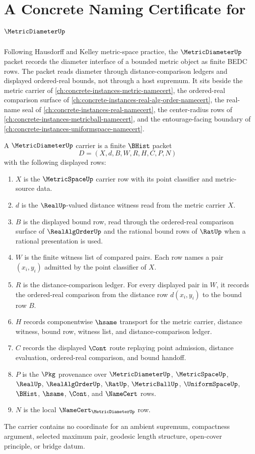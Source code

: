\chapter{A Concrete Naming Certificate for $\MetricDiameterUp$}
\label{ch:concrete-instances-metric-diameter-namecert}

Following Hausdorff and Kelley metric-space practice, the $\MetricDiameterUp$ packet records the diameter interface of a bounded metric object as finite BEDC rows. The packet reads diameter through distance-comparison ledgers and displayed ordered-real bounds, not through a host supremum. It sits beside the metric carrier of \autoref{ch:concrete-instances-metric-namecert}, the ordered-real comparison surface of \autoref{ch:concrete-instances-real-alg-order-namecert}, the real-name seal of \autoref{ch:concrete-instances-real-namecert}, the center-radius rows of \autoref{ch:concrete-instances-metricball-namecert}, and the entourage-facing boundary of \autoref{ch:concrete-instances-uniformspace-namecert}.

\begin{definition}
\label{def:metric-diameter-bhist-carrier}
A $\MetricDiameterUp$ carrier is a finite $\BHist$ packet
$$
D=(X,d,B,W,R,H,C,P,N)
$$
with the following displayed rows:
\begin{enumerate}
\item $X$ is the $\MetricSpaceUp$ carrier row with its point classifier and metric-source data.
\item $d$ is the $\RealUp$-valued distance witness read from the metric carrier $X$.
\item $B$ is the displayed bound row, read through the ordered-real comparison surface of $\RealAlgOrderUp$ and the rational bound rows of $\RatUp$ when a rational presentation is used.
\item $W$ is the finite witness list of compared pairs. Each row names a pair $(x_i,y_i)$ admitted by the point classifier of $X$.
\item $R$ is the distance-comparison ledger. For every displayed pair in $W$, it records the ordered-real comparison from the distance row $d(x_i,y_i)$ to the bound row $B$.
\item $H$ records componentwise $\hsame$ transport for the metric carrier, distance witness, bound row, witness list, and distance-comparison ledger.
\item $C$ records the displayed $\Cont$ route replaying point admission, distance evaluation, ordered-real comparison, and bound handoff.
\item $P$ is the $\Pkg$ provenance over $\MetricDiameterUp$, $\MetricSpaceUp$, $\RealUp$, $\RealAlgOrderUp$, $\RatUp$, $\MetricBallUp$, $\UniformSpaceUp$, $\BHist$, $\hsame$, $\Cont$, and $\NameCert$ rows.
\item $N$ is the local $\NameCert_{\MetricDiameterUp}$ row.
\end{enumerate}
The carrier contains no coordinate for an ambient supremum, compactness argument, selected maximum pair, geodesic length structure, open-cover principle, or bridge datum.
\end{definition}

